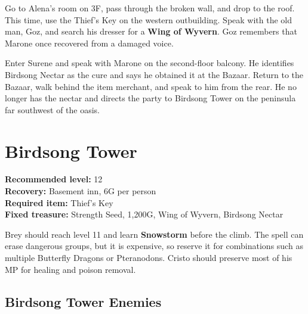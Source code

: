 \documentclass[
  american,
  10pt,
  letterpaper,
  oneside,
  open=any]{scrreprt}
\begin{document}
Go to Alena's room on 3F, pass through the broken wall, and drop to the
roof. This time, use the Thief's Key on the western outbuilding. Speak
with the old man, Goz, and search his dresser for a \textbf{Wing of
Wyvern}. Goz remembers that Marone once recovered from a damaged voice.

Enter Surene and speak with Marone on the second-floor balcony. He
identifies Birdsong Nectar as the cure and says he obtained it at the
Bazaar. Return to the Bazaar, walk behind the item merchant, and speak
to him from the rear. He no longer has the nectar and directs the party
to Birdsong Tower on the peninsula far southwest of the oasis.

\section{Birdsong Tower}\label{birdsong-tower}

\textbf{Recommended level:} 12\\
\textbf{Recovery:} Basement inn, 6G per person\\
\textbf{Required item:} Thief's Key\\
\textbf{Fixed treasure:} Strength Seed, 1,200G, Wing of Wyvern, Birdsong
Nectar

Brey should reach level 11 and learn \textbf{Snowstorm} before the
climb. The spell can erase dangerous groups, but it is expensive, so
reserve it for combinations such as multiple Butterfly Dragons or
Pteranodons. Cristo should preserve most of his MP for healing and
poison removal.

\subsection{Birdsong Tower Enemies}\label{birdsong-tower-enemies}
\end{document}
